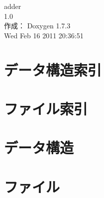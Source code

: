 \documentclass[a4paper]{book}
\begin{document}
\hypersetup{pageanchor=false}
\begin{titlepage}
\vspace*{7cm}
\begin{center}
{\Large adder \\[1ex]\large 1.0 }\\
\vspace*{1cm}
{\large 作成： Doxygen 1.7.3}\\
\vspace*{0.5cm}
{\small Wed Feb 16 2011 20:36:51}\\
\end{center}
\end{titlepage}
\clearemptydoublepage
{}
\tableofcontents
\clearemptydoublepage
{}
\hypersetup{pageanchor=true}
\chapter{データ構造索引}

\chapter{ファイル索引}

\chapter{データ構造}















\chapter{ファイル}


























\printindex
\end{document}
